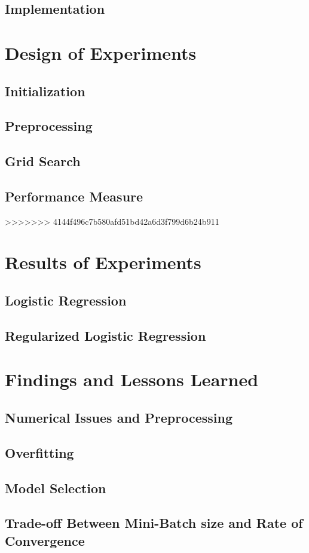 \documentclass[twoside,12pt]{article}
\begin{document}
\subsection{Implementation}

\section{Design of Experiments}
\subsection{Initialization}
\subsection{Preprocessing}
\subsection{Grid Search}
\subsection{Performance Measure}
>>>>>>> 4144f496c7b580afd51bd42a6d3f799d6b24b911

\section{Results of Experiments}
\subsection{Logistic Regression}
\subsection{Regularized Logistic Regression}

\section{Findings and Lessons Learned}
\subsection{Numerical Issues and Preprocessing}
\subsection{Overfitting}
\subsection{Model Selection}
\subsection{Trade-off Between Mini-Batch size and Rate of Convergence}
\end{document}
